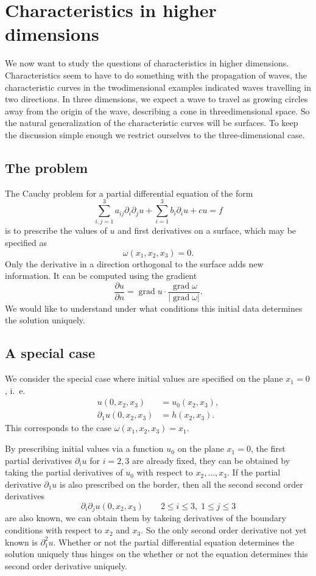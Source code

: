 %
%
%
\section{Characteristics in higher dimensions}
We now want to study the questions of characteristics in higher dimensions.
Characteristics seem to have to do something with the propagation of
waves, the characteristic curves in the twodimensional examples indicated
waves travelling in two directions.
In three dimensions, we expect a wave to travel as growing circles away from
the origin of the wave, describing a cone in threedimensional space.
So the natural generalization of the characteristic curves will be
surfaces.
To keep the discussion simple enough we restrict ourselves to the
three-dimensional case.

\subsection{The problem}
The Cauchy problem for a partial differential equation of the form
\[
\sum_{i,j=1}^3a_{ij}\partial_i\partial_ju+\sum_{i=1}^3b_i\partial_iu+cu=f
\]
is to prescribe the values of $u$ and first derivatives on a surface,
which may be specified as
\[
\omega(x_1,x_2,x_3)=0.
\]
Only the derivative in a direction orthogonal to the surface adds
new information.
It can be computed using the gradient
\[
\frac{\partial u}{\partial n}=\operatorname{grad}u\cdot \frac{\operatorname{grad}\omega}{|\operatorname{grad}\omega|}.
\]
We would like to understand under what conditions this initial data
determines the solution uniquely.

\subsection{A special case\label{subsection:a-special-case}}
We consider the special case where initial values are specified on the
plane $x_1=0$, i.~e.
\begin{align*}
u(0,x_2,x_3)&=u_0(x_2,x_3),
\\
\partial_1u(0,x_2,x_3)&=h(x_2,x_3).
\end{align*}
This corresponds to the case $\omega(x_1,x_2,x_3)=x_1$.

By prescribing initial values via a function $u_0$ on the plane $x_1=0$,
the first partial derivatives $\partial_iu$ for $i=2,3$ are already fixed,
they can be obtained by taking the partial derivatives of $u_0$
with respect to $x_2,\dots,x_3$.
If the partial derivative $\partial_1 u$ is also prescribed on the border,
then all the second second order derivatives
\[
\partial_i\partial_ju(0,x_2,x_3)\qquad 2\le i\le 3,\;1\le j\le 3
\]
are also known, we can obtain them by takeing derivatives of the
boundary conditions with respect to $x_2$ and $x_3$.
So the only second order derivative not yet known is $\partial_1^2u$.
Whether or not the partial differential equation determines the solution
uniquely thus hinges on the whether or not the equation determines
this second order derivative uniquely.

